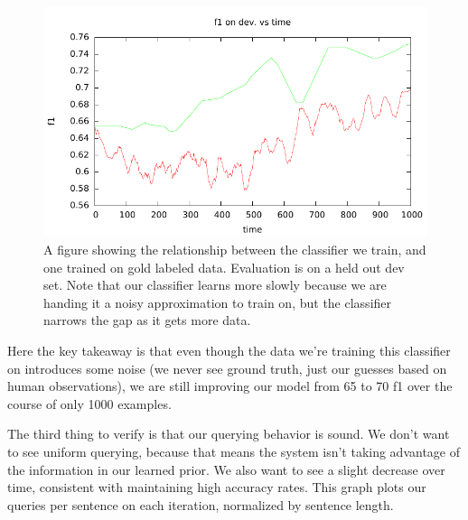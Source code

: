 \begin{figure}[t]
  \begin{centering}
  \includegraphics[width=1.0\textwidth]{figures/ner_2_class/machine_f1_plot/machine_f1_vs_time.pdf}
  \end{centering}
  \caption{A figure showing the relationship between the classifier we train, and one trained on gold labeled data. Evaluation is on a held out dev set. Note that our classifier learns more slowly because we are handing it a noisy approximation to train on, but the classifier narrows the gap as it gets more data.}
\label{fig:crf}
\end{figure}

Here the key takeaway is that even though the data we're training this classifier on introduces some noise (we never see
ground truth, just our guesses based on human observations), we are still improving our model from 65 to 70 f1 over the course
of only 1000 examples.

The third thing to verify is that our querying behavior is sound.
We don't want to see uniform querying, because that means the system isn't taking advantage of the information in our learned prior.
We also want to see a slight decrease over time, consistent with maintaining high accuracy rates.
This graph plots our queries per sentence on each iteration, normalized by sentence length.

